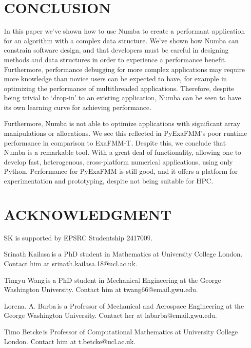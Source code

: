 \documentclass{IEEEcsmag}
\begin{document}
\section{CONCLUSION}

In this paper we've shown how to use Numba to create a performant application for an algorithm with a complex data structure. We've shown how Numba can constrain software design, and that developers must be careful in designing methods and data structures in order to experience a performance benefit. Furthermore, performance debugging for more complex applications may require more knowledge than novice users can be expected to have, for example in optimizing the performance of multithreaded applications. Therefore, despite being trivial to `drop-in' to an existing application, Numba can be seen to have its own learning curve for achieving performance.

Furthermore, Numba is not able to optimize applications with significant array manipulations or allocations. We see this reflected in PyExaFMM's poor runtime performance in comparison to ExaFMM-T. Despite this, we conclude that Numba is a remarkable tool. With a great deal of functionality, allowing one to develop fast, heterogenous, cross-platform numerical applications, using only Python. Performance for PyExaFMM is still good, and it offers a platform for experimentation and prototyping, despite not being suitable for HPC.

\section{ACKNOWLEDGMENT}

SK is supported by EPSRC Studentship 2417009.





\begin{IEEEbiography}{Srinath Kailasa}{\,}is a PhD student in Mathematics at University College London. Contact him at srinath.kailasa.18@ucl.ac.uk.
\end{IEEEbiography}

\begin{IEEEbiography}{Tingyu Wang}{\,}is a PhD student in Mechanical Engineering at the George Washington University. Contact him at twang66@email.gwu.edu.
\end{IEEEbiography}

\begin{IEEEbiography}{Lorena. A. Barba}{\,}is a Professor of Mechanical and Aerospace Engineering at the George Washington University.  Contact her at labarba@email.gwu.edu.
\end{IEEEbiography}

\begin{IEEEbiography}{Timo Betcke}{\,}is Professor of Computational Mathematics at University College London. Contact him at t.betcke@ucl.ac.uk.
\end{IEEEbiography}
\end{document}
